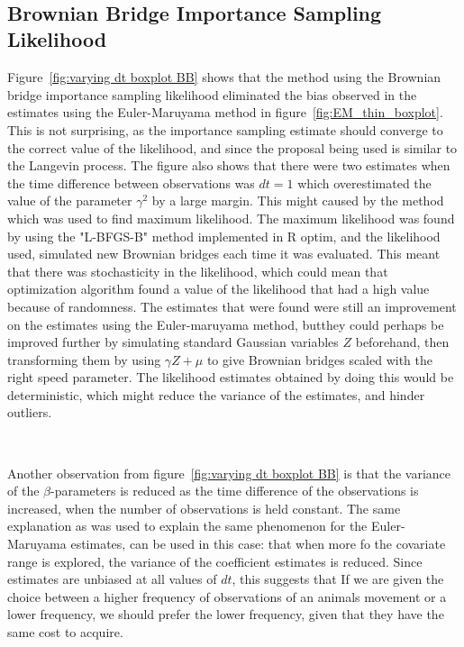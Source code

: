 \

\subsection{Brownian Bridge Importance Sampling Likelihood}
Figure~\ref{fig:varying dt boxplot BB} shows that the method using the Brownian bridge importance sampling likelihood eliminated the bias observed in the estimates using the Euler-Maruyama method in figure~\ref{fig:EM_thin_boxplot}. This is not surprising, as the importance sampling estimate should converge to the correct value of the likelihood, and since the proposal being used is similar to the Langevin process. The figure also shows that there were two estimates when the time difference between observations was $dt=1$ which overestimated the value of the parameter $\gamma^2$ by a large margin. This might caused by the method which was used to find maximum likelihood. The maximum likelihood was found by using the "L-BFGS-B" method implemented in R optim, and the likelihood used, simulated new Brownian bridges each time it was evaluated. This meant that there was stochasticity in the likelihood, which could mean that optimization algorithm found a value of the likelihood that had a high value because of randomness. The estimates that were found were still an improvement on the estimates using the Euler-maruyama method, butthey could perhaps be improved further by simulating standard Gaussian variables $Z$ beforehand, then transforming them by using $\gamma Z +\mu$ to give Brownian bridges scaled with the right speed parameter. The likelihood estimates obtained by doing this would be deterministic, which might reduce the variance of the estimates, and hinder outliers.

\

Another observation from figure~\ref{fig:varying dt boxplot BB} is that the variance of the $\beta$-parameters is reduced as the time difference of the observations is increased, when the number of observations is held constant. The same explanation as was used to explain the same phenomenon for the Euler-Maruyama estimates, can be used in this case: that when more fo the covariate range is explored, the variance of the coefficient estimates is reduced. Since estimates are unbiased at all values of $dt$, this suggests that If we are given the choice between a higher frequency of observations of an animals movement or a lower frequency, we should prefer the lower frequency, given that they have the same cost to acquire.

